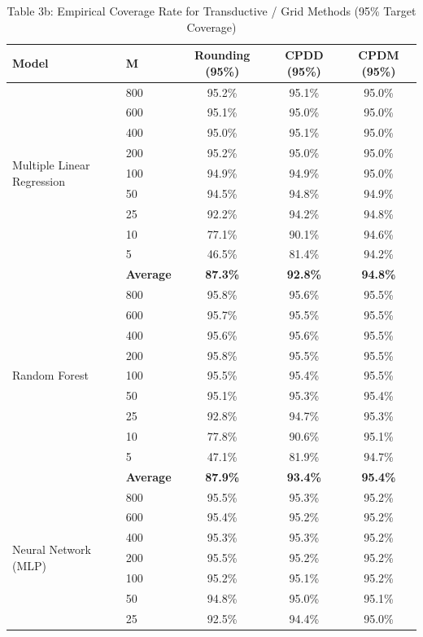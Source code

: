 \documentclass[11pt,a4paper]{article}
\begin{document}
\begin{table}[H]
\centering
\caption{Table 3b: Empirical Coverage Rate for Transductive / Grid Methods (95\% Target Coverage)}
\label{tab:3b}
\scriptsize
\begin{tabular}{llccc}
\toprule
Model & M & Rounding (95\%) & CPDD (95\%) & CPDM (95\%) \\
\midrule
\multirow{9}{*}{Multiple Linear Regression}
 & 800 & 95.2\% & 95.1\% & 95.0\% \\
 & 600 & 95.1\% & 95.0\% & 95.0\% \\
 & 400 & 95.0\% & 95.1\% & 95.0\% \\
 & 200 & 95.2\% & 95.0\% & 95.0\% \\
 & 100 & 94.9\% & 94.9\% & 95.0\% \\
 & 50  & 94.5\% & 94.8\% & 94.9\% \\
 & 25  & 92.2\% & 94.2\% & 94.8\% \\
 & 10  & 77.1\% & 90.1\% & 94.6\% \\
 & 5   & 46.5\% & 81.4\% & 94.2\% \\
 & \textbf{Average} & \textbf{87.3\%} & \textbf{92.8\%} & \textbf{94.8\%} \\
\midrule
\multirow{9}{*}{Random Forest}
 & 800 & 95.8\% & 95.6\% & 95.5\% \\
 & 600 & 95.7\% & 95.5\% & 95.5\% \\
 & 400 & 95.6\% & 95.6\% & 95.5\% \\
 & 200 & 95.8\% & 95.5\% & 95.5\% \\
 & 100 & 95.5\% & 95.4\% & 95.5\% \\
 & 50  & 95.1\% & 95.3\% & 95.4\% \\
 & 25  & 92.8\% & 94.7\% & 95.3\% \\
 & 10  & 77.8\% & 90.6\% & 95.1\% \\
 & 5   & 47.1\% & 81.9\% & 94.7\% \\
 & \textbf{Average} & \textbf{87.9\%} & \textbf{93.4\%} & \textbf{95.4\%} \\
\midrule
\multirow{9}{*}{Neural Network (MLP)}
 & 800 & 95.5\% & 95.3\% & 95.2\% \\
 & 600 & 95.4\% & 95.2\% & 95.2\% \\
 & 400 & 95.3\% & 95.3\% & 95.2\% \\
 & 200 & 95.5\% & 95.2\% & 95.2\% \\
 & 100 & 95.2\% & 95.1\% & 95.2\% \\
 & 50  & 94.8\% & 95.0\% & 95.1\% \\
 & 25  & 92.5\% & 94.4\% & 95.0\% \\

\end{tabular}
\end{table}
\end{document}
